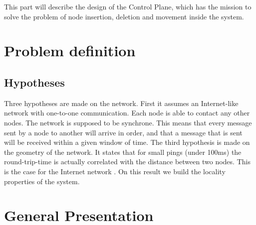 \documentclass[a4paper,11pt,oneside]{report}
\begin{document}
This part will describe the design of the Control Plane, which has the mission
to solve the problem of node insertion, deletion and movement inside the
system.

\section{Problem definition}

\subsection{Hypotheses}
Three hypotheses are made on the network. First it
assumes an Internet-like network with one-to-one communication. Each node is
able to contact any other nodes. The network is supposed to be synchrone. This
means that every message sent by a node to another will arrive in order, and
that a message that is sent will be received within a given window of time. The
third hypothesis is made on the geometry of the network. It states that for
small pings (under 100ms) the round-trip-time is actually correlated with the
distance between two nodes. This is the case for the Internet network
\cite{Seibert2014}. On this result we build the locality properties of the
system. 


\section{General Presentation}
\end{document}
